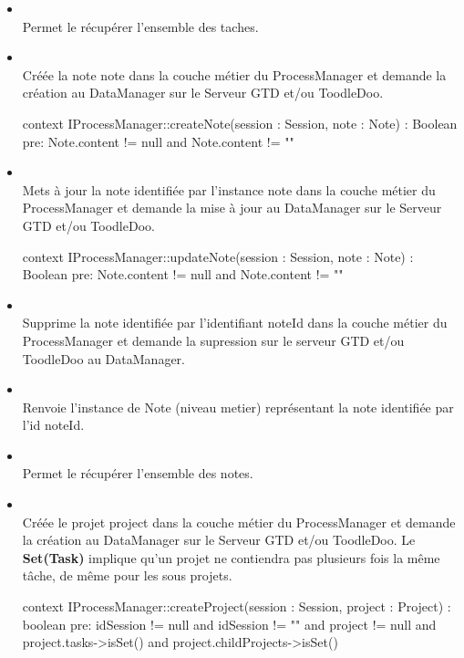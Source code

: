 \begin{itemize}
		\item {} \\
		Permet le récupérer l'ensemble des taches.
		
		\item {} \\
		Créée la note note dans la couche métier du ProcessManager et demande la
		création au DataManager sur le Serveur GTD et/ou ToodleDoo.
\begin{ocl}
context IProcessManager::createNote(session : Session, note : Note) : Boolean
pre: 
	Note.content != null and Note.content != ""
\end{ocl}

		\item {} \\
		Mets à jour la note identifiée par l'instance note dans la couche métier du
		ProcessManager et demande la mise à jour au DataManager sur le Serveur GTD
		et/ou ToodleDoo.
\begin{ocl}
context IProcessManager::updateNote(session : Session, note : Note) : Boolean
pre: 
	Note.content != null and Note.content != ""
\end{ocl}
		
		\item {} \\
		Supprime la note identifiée par l'identifiant noteId dans la couche métier
		du ProcessManager et demande la supression sur le serveur GTD et/ou ToodleDoo
		au DataManager.
		
		\item {} \\
		Renvoie l'instance de Note (niveau metier) représentant la note identifiée
		par l'id noteId.
		
		\item {} \\
		Permet le récupérer l'ensemble des notes.		
		
		\item {} \\
		Créée le projet project dans la couche métier du ProcessManager et demande la
		création au DataManager sur le Serveur GTD et/ou ToodleDoo.
		Le \textbf{Set(Task)} implique qu'un projet ne contiendra pas plusieurs fois la même tâche, de même pour les sous projets.
\begin{ocl}
context IProcessManager::createProject(session : Session, project : Project) : boolean
pre: 
	idSession != null and idSession != "" and
	project != null and
	project.tasks->isSet() and
	project.childProjects->isSet()
\end{ocl}


\end{itemize}
